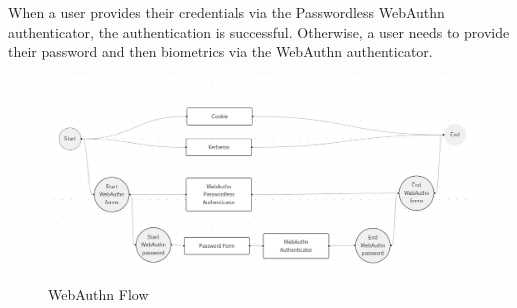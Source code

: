 When a user provides their credentials via the Passwordless WebAuthn authenticator, the authentication is successful.
Otherwise, a user needs to provide their password and then biometrics via the WebAuthn authenticator.

\begin{figure}[htbp]
  \centering
  \includegraphics[width=1.04\textwidth]{img/flow.png}
  \caption{WebAuthn Flow}
  \label{fig:basic-auth-flow}
\end{figure}

\Blindtext